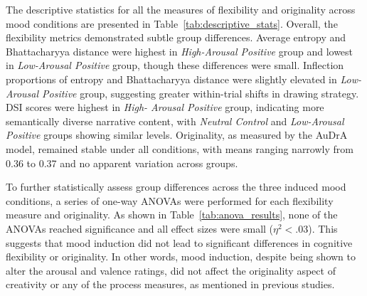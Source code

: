 \documentclass[../MA_Thesis.tex]{subfiles}
\begin{document}
The descriptive statistics for all the measures of flexibility and originality across mood conditions are presented in Table~\ref{tab:descriptive_stats}. Overall, the flexibility metrics demonstrated subtle group differences. Average entropy and Bhattacharyya distance were highest in \textit{High-Arousal Positive} group and lowest in \textit{Low-Arousal Positive} group, though these differences were small. Inflection proportions of entropy and Bhattacharyya distance were slightly elevated in \textit{Low-Arousal Positive} group, suggesting greater within-trial shifts in drawing strategy. DSI scores were highest in \textit{High- Arousal Positive} group, indicating more semantically diverse narrative content, with \textit{Neutral Control} and \textit{Low-Arousal Positive} groups showing similar levels. Originality, as measured by the AuDrA model, remained stable under all conditions, with means ranging narrowly from 0.36 to 0.37 and no apparent variation across groups. 

To further statistically assess group differences across the three induced mood conditions, a series of one-way ANOVAs were performed for each flexibility measure and originality. As shown in Table~\ref{tab:anova_results}, none of the ANOVAs reached significance and all effect sizes were small ($\eta^2 < .03$). This suggests that mood induction did not lead to significant differences in cognitive flexibility or originality. In other words, mood induction, despite being shown to alter the arousal and valence ratings, did not affect the originality aspect of creativity or any of the process measures, as mentioned in previous studies. 
\end{document}
